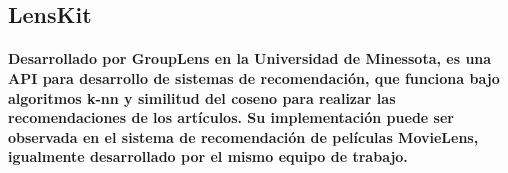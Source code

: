   \subsection{LensKit}
    \paragraph{Desarrollado por GroupLens en la Universidad de Minessota, es una API para desarrollo de sistemas de recomendación, que funciona bajo algoritmos k-nn y similitud del coseno para realizar las recomendaciones de los artículos. Su implementación puede ser observada en el sistema de recomendación de películas MovieLens, igualmente desarrollado por el mismo equipo de trabajo.}
